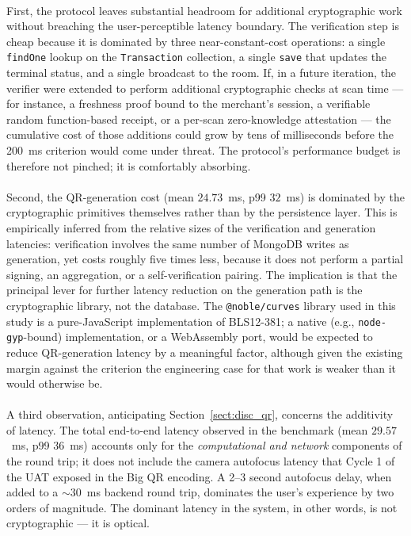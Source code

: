 \paragraph{}First, the protocol leaves substantial headroom for additional cryptographic work without breaching the user-perceptible latency boundary. The verification step is cheap because it is dominated by three near-constant-cost operations: a single \texttt{findOne} lookup on the \texttt{Transaction} collection, a single \texttt{save} that updates the terminal status, and a single broadcast to the room. If, in a future iteration, the verifier were extended to perform additional cryptographic checks at scan time --- for instance, a freshness proof bound to the merchant's session, a verifiable random function-based receipt, or a per-scan zero-knowledge attestation --- the cumulative cost of those additions could grow by tens of milliseconds before the 200~ms criterion would come under threat. The protocol's performance budget is therefore not pinched; it is comfortably absorbing.

\paragraph{}Second, the QR-generation cost (mean $24.73$~ms, p99 $32$~ms) is dominated by the cryptographic primitives themselves rather than by the persistence layer. This is empirically inferred from the relative sizes of the verification and generation latencies: verification involves the same number of MongoDB writes as generation, yet costs roughly five times less, because it does not perform a partial signing, an aggregation, or a self-verification pairing. The implication is that the principal lever for further latency reduction on the generation path is the cryptographic library, not the database. The \texttt{@noble/curves} library used in this study is a pure-JavaScript implementation of BLS12-381; a native (e.g., \texttt{node-gyp}-bound) implementation, or a WebAssembly port, would be expected to reduce QR-generation latency by a meaningful factor, although given the existing margin against the criterion the engineering case for that work is weaker than it would otherwise be.

\paragraph{}A third observation, anticipating Section~\ref{sect:disc_qr}, concerns the additivity of latency. The total end-to-end latency observed in the benchmark (mean $29.57$~ms, p99 $36$~ms) accounts only for the \textit{computational and network} components of the round trip; it does not include the camera autofocus latency that Cycle 1 of the UAT exposed in the Big QR encoding. A 2--3 second autofocus delay, when added to a $\sim 30$~ms backend round trip, dominates the user's experience by two orders of magnitude. The dominant latency in the system, in other words, is not cryptographic --- it is optical.

